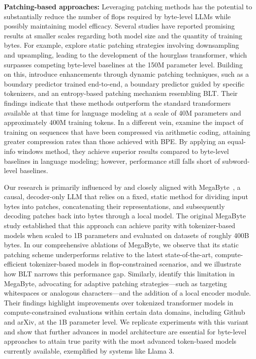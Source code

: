 \textbf{Patching-based approaches:} Leveraging patching methods has the potential to substantially reduce the number of flops required by byte-level LLMs while possibly maintaining model efficacy. Several studies have reported promising results at smaller scales regarding both model size and the quantity of training bytes. For example, \cite{nawrot-etal-2022-hierarchical} explore static patching strategies involving downsampling and upsampling, leading to the development of the hourglass transformer, which surpasses competing byte-level baselines at the 150M parameter level. Building on this, \cite{nawrot-etal-2023-efficient} introduce enhancements through dynamic patching techniques, such as a boundary predictor trained end-to-end, a boundary predictor guided by specific tokenizers, and an entropy-based patching mechanism resembling {\textsc BLT}. Their findings indicate that these methods outperform the standard transformers available at that time for language modeling at a scale of 40M parameters and approximately 400M training tokens. In a different vein, \cite{lester2024training} examine the impact of training on sequences that have been compressed via arithmetic coding, attaining greater compression rates than those achieved with BPE. By applying an equal-info windows method, they achieve superior results compared to byte-level baselines in language modeling; however, performance still falls short of subword-level baselines.

Our research is primarily influenced by and closely aligned with MegaByte~\citep{yu2023megabyte}, a causal, decoder-only LLM that relies on a fixed, static method for dividing input bytes into patches, concatenating their representations, and subsequently decoding patches back into bytes through a local model. The original MegaByte study established that this approach can achieve parity with tokenizer-based models when scaled to 1B parameters and evaluated on datasets of roughly 400B bytes. In our comprehensive ablations of MegaByte, we observe that its static patching scheme underperforms relative to the latest state-of-the-art, compute-efficient tokenizer-based models in flop-constrained scenarios, and we illustrate how {\textsc BLT} narrows this performance gap. Similarly, \cite{slagle2024spacebyte} identify this limitation in MegaByte, advocating for adaptive patching strategies—such as targeting whitespaces or analogous characters—and the addition of a local encoder module. Their findings highlight improvements over tokenized transformer models in compute-constrained evaluations within certain data domains, including Github and arXiv, at the 1B parameter level. We replicate experiments with this variant and show that further advances in model architecture are essential for byte-level approaches to attain true parity with the most advanced token-based models currently available, exemplified by systems like Llama 3.


